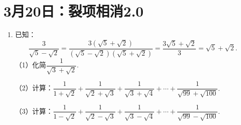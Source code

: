 \section*{3月20日：裂项相消2.0}

\begin{enumerate}
    \item 已知：$$\dfrac{3}{\sqrt{5}-\sqrt{2}}=\dfrac{3(\sqrt{5}+\sqrt{2})}{(\sqrt{5}-\sqrt{2})(\sqrt{5}+\sqrt{2})}=\dfrac{3\sqrt{5}+\sqrt{2}}{3}=\sqrt{5}+\sqrt{2}.$$
    （1）化简$\dfrac{1}{\sqrt{3}+\sqrt{2}}.$

    （2）计算：$\dfrac{1}{1+\sqrt{2}}+\dfrac{1}{\sqrt{2}+\sqrt{3}}+\dfrac{1}{\sqrt{3}+\sqrt{4}}+\cdots+\dfrac{1}{\sqrt{99}+\sqrt{100}}.$

    （3）计算：$\dfrac{1}{1-\sqrt{2}}+\dfrac{1}{\sqrt{2}-\sqrt{3}}+\dfrac{1}{\sqrt{3}-\sqrt{4}}+\cdots+\dfrac{1}{\sqrt{99}-\sqrt{100}}.$
\end{enumerate}




